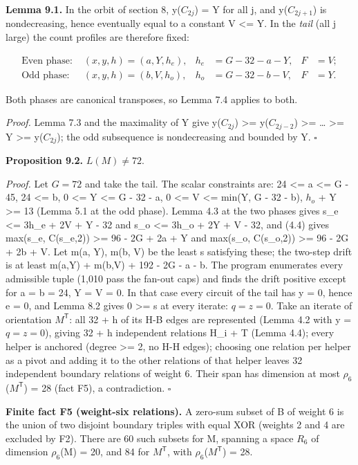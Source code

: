 \textbf{Lemma 9.1.} In the orbit of section 8, y(\(C_{2j}\)) = Y for all j, and y(\(C_{2j+1}\)) is nondecreasing, hence eventually equal to a constant V \textless= Y. In the \emph{tail} (all j large) the count profiles are therefore fixed:

\[
\begin{aligned}
\text{Even phase: }&(x,y,h)=(a,Y,h_e),& h_e&=G-32-a-Y,&F&=V;\\
\text{Odd phase: }&(x,y,h)=(b,V,h_o),& h_o&=G-32-b-V,&F&=Y.
\end{aligned}
\]

Both phases are canonical transposes, so Lemma 7.4 applies to both.

\emph{Proof.} Lemma 7.3 and the maximality of Y give y(\(C_{2j}\)) \textgreater= y(\(C_{2j-2}\)) \textgreater= \ldots{} \textgreater= Y \textgreater= y(\(C_{2j}\)); the odd subsequence is nondecreasing and bounded by Y. \(\square\)

\textbf{Proposition 9.2.} \(L(M)\ne72\).

\emph{Proof.} Let \(G=72\) and take the tail. The scalar constraints are: 24 \textless= a \textless= G - 45, 24 \textless= b, 0 \textless= Y \textless= G - 32 - a, 0 \textless= V \textless= min(Y, G - 32 - b), \(h_o\) + Y \textgreater= 13 (Lemma 5.1 at the odd phase). Lemma 4.3 at the two phases gives s\_e \textless= 3h\_e + 2V + Y - 32 and s\_o \textless= 3h\_o + 2Y + V - 32, and (4.4) gives max(s\_e, C(s\_e,2)) \textgreater= 96 - 2G + 2a + Y and max(s\_o, C(s\_o,2)) \textgreater= 96 - 2G + 2b + V. Let m(a, Y), m(b, V) be the least s satisfying these; the two-step drift is at least m(a,Y) + m(b,V) + 192 - 2G - a - b. The program \texttt{} enumerates every admissible tuple (1,010 pass the fan-out caps) and finds the drift positive except for a = b = 24, Y = V = 0. In that case every circuit of the tail has y = 0, hence e = 0, and Lemma 8.2 gives 0 \textgreater= s at every iterate: \(q=z=0\). Take an iterate of orientation \(M^{\mathsf T}\): all 32 + h of its H-B edges are represented (Lemma 4.2 with y = \(q=z=0\)), giving 32 + h independent relations H\_i + T (Lemma 4.4); every helper is anchored (degree \textgreater= 2, no H-H edges); choosing one relation per helper as a pivot and adding it to the other relations of that helper leaves 32 independent boundary relations of weight 6. Their span has dimension at most \(\rho_6\)(\(M^{\mathsf T}\)) = 28 (fact F5), a contradiction. \(\square\)

\textbf{Finite fact F5 (weight-six relations).} A zero-sum subset of B of weight 6 is the union of two disjoint boundary triples with equal XOR (weights 2 and 4 are excluded by F2). There are 60 such subsets for M, spanning a space \(R_6\) of dimension \(\rho_6\)(M) = 20, and 84 for \(M^{\mathsf T}\), with \(\rho_6\)(\(M^{\mathsf T}\)) = 28.

